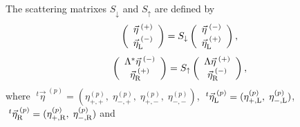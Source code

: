 \documentclass{jpsj3}
\begin{document}
The scattering matrixes $S_\downarrow$ and $S_\uparrow$
are
defined by
\begin{equation}
\left(
\begin{array}{c}
\vec{\eta}^{\;(+)} \\
\vec{\eta}^{\;(-)}_{\rm L}
\end{array}
\right)
=
S_{\downarrow}
\left(
\begin{array}{c}
\vec{\eta}^{\;(-)} \\
\vec{\eta}^{\;(+)}_{\rm L}
\end{array}
\right),
\label{sl-exact}
\end{equation}
\begin{equation}
\left(
\begin{array}{c}
\Lambda^* \vec{\eta}^{\;(-)} \\
\vec{\eta}^{\;(+)}_{\rm R}
\end{array}
\right)
=
S_{\uparrow}
\left(
\begin{array}{c}
\Lambda\vec{\eta}^{\;(+)} \\
\vec{\eta}^{\;(-)}_{\rm R}
\end{array}
\right),
\label{sr-exact}
\end{equation}
where 
$\;^t\vec{\eta}^{\;(p)}=(\eta_{+,+}^{(p)},\;\eta_{-,+}^{(p)},\;\eta_{+,-}^{(p)},\;\eta_{-,-}^{(p)})
$, $\;^t\vec{\eta}^{\;(p)}_{\rm L}
=(\eta_{+,{\rm L}}^{(p)},\;\eta_{-,{\rm L}}^{(p)})
$,
$\;^t\vec{\eta}^{\;(p)}_{{\rm R}}
=(\eta_{+,{\rm R}}^{(p)},\;\eta_{-,{\rm R}}^{(p)})
$ and
\end{document}
